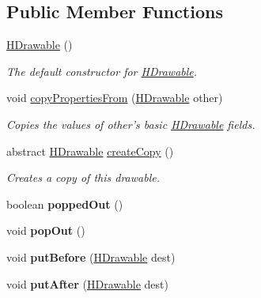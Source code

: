 \subsection*{Public Member Functions}
\begin{DoxyCompactItemize}
\item 
\hyperlink{classhype_1_1drawable_1_1_h_drawable_a4e50b6062d301f3181bb258e71e8a93a}{H\-Drawable} ()
\begin{DoxyCompactList}\small\item\em The default constructor for \hyperlink{classhype_1_1drawable_1_1_h_drawable}{H\-Drawable}. \end{DoxyCompactList}\item 
void \hyperlink{classhype_1_1drawable_1_1_h_drawable_a8982d36cad4f3e2420dd193c27c97611}{copy\-Properties\-From} (\hyperlink{classhype_1_1drawable_1_1_h_drawable}{H\-Drawable} other)
\begin{DoxyCompactList}\small\item\em Copies the values of {\ttfamily other}'s basic \hyperlink{classhype_1_1drawable_1_1_h_drawable}{H\-Drawable} fields. \end{DoxyCompactList}\item 
abstract \hyperlink{classhype_1_1drawable_1_1_h_drawable}{H\-Drawable} \hyperlink{classhype_1_1drawable_1_1_h_drawable_a9664f945675efa02d30228ca27d5819d}{create\-Copy} ()
\begin{DoxyCompactList}\small\item\em Creates a copy of this drawable. \end{DoxyCompactList}\item 
\hypertarget{classhype_1_1drawable_1_1_h_drawable_a1b4bd3793eea2437877e6fdd413db4ed}{boolean {\bfseries popped\-Out} ()}\label{classhype_1_1drawable_1_1_h_drawable_a1b4bd3793eea2437877e6fdd413db4ed}

\item 
\hypertarget{classhype_1_1drawable_1_1_h_drawable_ac7d18d71288f63ba9540c6f55625f5b2}{void {\bfseries pop\-Out} ()}\label{classhype_1_1drawable_1_1_h_drawable_ac7d18d71288f63ba9540c6f55625f5b2}

\item 
\hypertarget{classhype_1_1drawable_1_1_h_drawable_a21d7d66b17575b8a05aec9ced6971387}{void {\bfseries put\-Before} (\hyperlink{classhype_1_1drawable_1_1_h_drawable}{H\-Drawable} dest)}\label{classhype_1_1drawable_1_1_h_drawable_a21d7d66b17575b8a05aec9ced6971387}

\item 
\hypertarget{classhype_1_1drawable_1_1_h_drawable_a43fe6994b54fae7b0777ad0d343a8580}{void {\bfseries put\-After} (\hyperlink{classhype_1_1drawable_1_1_h_drawable}{H\-Drawable} dest)}\label{classhype_1_1drawable_1_1_h_drawable_a43fe6994b54fae7b0777ad0d343a8580}


\end{DoxyCompactItemize}
